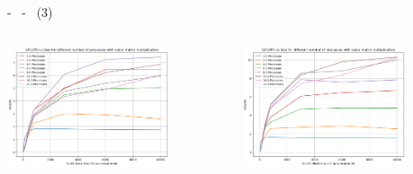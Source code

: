 \documentclass[compress]{beamer}
\begin{document}
\begin{frame}{\secname \text{ }- \subsecname\ \text{ }- \subsubsecname\ (3)}
\begin{columns}
\begin{minipage}{1\textwidth}
                \centering
                \begin{adjustbox}{margin=0cm 0cm 0cm 0cm, center} %
                    \includegraphics[width=0.75\textwidth, frame]{resources/rect_k64_naive_nocrit.png}
                \end{adjustbox}
                \begin{adjustbox}{margin=0cm 0cm 0cm 0.1cm, center} %
                    \includegraphics[width=0.75\textwidth, frame]{resources/rect_k156_naive_nocrit.png}
                \end{adjustbox}
            \end{minipage}
    \end{columns}
\end{frame}
\end{document}
